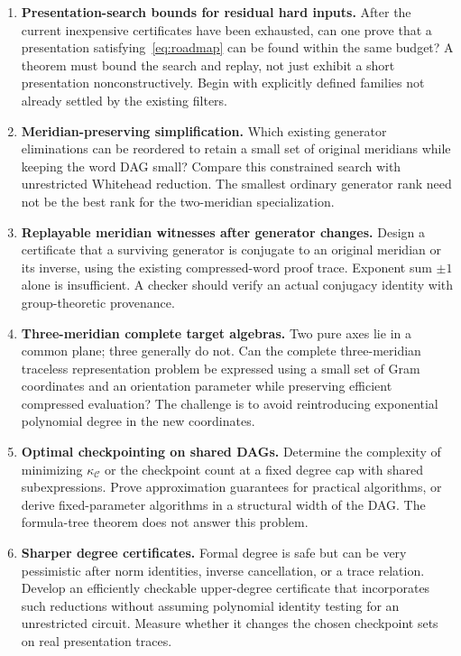 \documentclass[11pt]{article}
\theoremstyle{definition}
\theoremstyle{remark}
\newcommand{\calC}{\mathcal C}
\begin{document}
\begin{enumerate}[label=\textbf{Q\arabic*.},leftmargin=13mm]
\item \textbf{Presentation-search bounds for residual hard inputs.}
After the current inexpensive certificates have been exhausted, can one prove that a presentation satisfying~\eqref{eq:roadmap} can be found within the same budget? A theorem must bound the search and replay, not just exhibit a short presentation nonconstructively. Begin with explicitly defined families not already settled by the existing filters.

\item \textbf{Meridian-preserving simplification.}
Which existing generator eliminations can be reordered to retain a small set of original meridians while keeping the word DAG small? Compare this constrained search with unrestricted Whitehead reduction. The smallest ordinary generator rank need not be the best rank for the two-meridian specialization.

\item \textbf{Replayable meridian witnesses after generator changes.}
Design a certificate that a surviving generator is conjugate to an original meridian or its inverse, using the existing compressed-word proof trace. Exponent sum $\pm1$ alone is insufficient. A checker should verify an actual conjugacy identity with group-theoretic provenance.

\item \textbf{Three-meridian complete target algebras.}
Two pure axes lie in a common plane; three generally do not. Can the complete three-meridian traceless representation problem be expressed using a small set of Gram coordinates and an orientation parameter while preserving efficient compressed evaluation? The challenge is to avoid reintroducing exponential polynomial degree in the new coordinates.

\item \textbf{Optimal checkpointing on shared DAGs.}
Determine the complexity of minimizing $\kappa_{\calC}$ or the checkpoint count at a fixed degree cap with shared subexpressions. Prove approximation guarantees for practical algorithms, or derive fixed-parameter algorithms in a structural width of the DAG. The formula-tree theorem does not answer this problem.

\item \textbf{Sharper degree certificates.}
Formal degree is safe but can be very pessimistic after norm identities, inverse cancellation, or a trace relation. Develop an efficiently checkable upper-degree certificate that incorporates such reductions without assuming polynomial identity testing for an unrestricted circuit. Measure whether it changes the chosen checkpoint sets on real presentation traces.


\end{enumerate}
\end{document}
